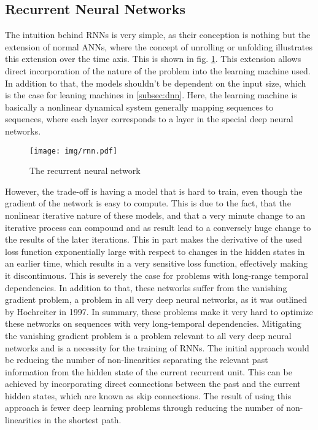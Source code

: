 		\subsection{Recurrent Neural Networks}\label{subsec:rnns}
			The intuition behind RNNs is very simple, as their conception is nothing but the extension of normal ANNs, where the concept of unrolling or unfolding illustrates this extension over the time axis. This is shown in fig. \ref{fig:rnn}. This extension allows direct incorporation of the nature of the problem into the learning machine used. In addition to that, the models shouldn't be dependent on the input size, which is the case for leaning machines in \ref{subsec:dnn}.  Here, the learning machine is basically a nonlinear dynamical system generally mapping sequences to sequences, where each layer corresponds to a layer in the special deep neural networks.\newline
			\begin{figure}[H]
				\centering
				\texttt{[image: img/rnn.pdf]}
				\caption{The recurrent neural network}
				\label{fig:rnn}
			\end{figure}
			However, the trade-off is having a model that is hard to train, even though the gradient of the network is easy to compute. This is due to the fact, that the nonlinear iterative nature of these models, and that a very minute change to an iterative process can compound and as result lead to a conversely huge change to the results of the later iterations. This in part makes the derivative of the used loss function exponentially large with respect to changes in the hidden states in an earlier time, which results in a very sensitive loss function, effectively making it discontinuous. This is severely the case for problems with long-range temporal dependencies\cite{sutskever2013training}. In addition to that, these networks suffer from the vanishing gradient problem, a problem in all very deep neural networks, as it was outlined by Hochreiter in 1997\cite{hochreiter1997long}. In summary, these problems make it very hard to optimize these networks on sequences with very long-temporal dependencies.\newline
			Mitigating the vanishing gradient problem is a problem relevant to all very deep neural networks and is a necessity for the training of RNNs. The initial approach would be reducing the number of non-linearities separating the relevant past information from the hidden state of the current recurrent unit. This can be achieved by incorporating direct connections between the past and the current hidden states, which are known as skip connections. The result of using this approach is fewer deep learning problems through reducing the number of non-linearities in the shortest path\cite{hochreiter1997long}.\newline
